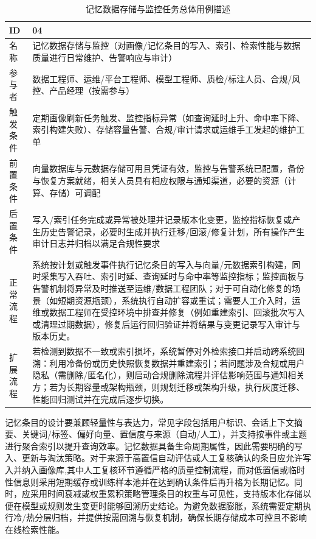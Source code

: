 \begin{table}[h]
\centering
\caption{记忆数据存储与监控任务总体用例描述}
\label{tab:memory_storage_monitoring_usecase}
{\renewcommand{\arraystretch}{1.2}
\begin{tabular}{p{} p{}}
\hline
ID & 04 \\
\hline
名称 & 记忆数据存储与监控（对画像/记忆条目的写入、索引、检索性能与数据质量进行日常维护、告警响应与审计） \\
\hline
参与者 & 数据工程师、运维/平台工程师、模型工程师、质检/标注人员、合规/风控、产品经理（按需参与） \\
\hline
触发条件 & 定期画像刷新任务触发、监控指标异常（如查询延时上升、命中率下降、索引构建失败）、存储容量告警、合规/审计请求或运维手工发起的维护工单 \\
\hline
前置条件 & 向量数据库与元数据存储可用且凭证有效，监控与告警系统已配置，备份与恢复方案就绪，相关人员具有相应权限与通知渠道，必要的资源（计算、存储）可调配 \\
\hline
后置条件 & 写入/索引任务完成或异常被处理并记录版本化变更，监控指标恢复或产生历史告警记录，必要时生成并执行迁移/回滚/修复计划，所有操作产生审计日志并归档以满足合规性要求 \\
\hline
正常流程 & 系统按计划或触发事件执行记忆条目的写入与向量/元数据索引构建，同时采集写入吞吐、索引时延、查询延时与命中率等监控指标；监控面板与告警机制将异常及时推送至运维/数据工程团队；对于可自动化修复的场景（如短期资源瓶颈），系统执行自动扩容或重试；需要人工介入时，运维或数据工程师在受控环境中排查并修复（例如重建索引、回滚批次写入或清理过期数据），修复后运行回归验证并将结果与变更记录写入审计与版本历史。 \\
\hline
扩展流程 & 若检测到数据不一致或索引损坏，系统暂停对外检索接口并启动跨系统回溯：利用冷备份或历史快照恢复数据并重建索引；若问题涉及合规或用户隐私（需删除/匿名化），则启动合规删除流程并评估影响范围与通知相关方；若为长期容量或架构瓶颈，则规划迁移或架构升级，执行灰度迁移、性能回归测试并在完成后逐步切换。 \\
\hline
\end{tabular}
}
\end{table}
记忆条目的设计要兼顾轻量性与表达力，常见字段包括用户标识、会话上下文摘要、关键词/标签、偏好向量、置信度与来源（自动/人工），并支持按事件或主题进行聚合索引以提升查询效率。记忆数据具备生命周期属性，因此需要明确的写入、更新与淘汰策略。对于来源于高置信自动评估或人工复核确认的条目应允许写入并纳入画像库,其中人工复核环节遵循严格的质量控制流程，而对低置信或临时性信息则采用短期缓存或训练样本池并在达到确认条件后再升格为长期记忆。同时，应采用时间衰减或权重累积策略管理条目的权重与可见性，支持版本化存储以便在模型或规则发生变更时能够回溯历史结论。为避免数据膨胀，系统需要定期执行冷/热分层归档，并提供按需回溯与恢复机制，确保长期存储成本可控且不影响在线检索性能。

